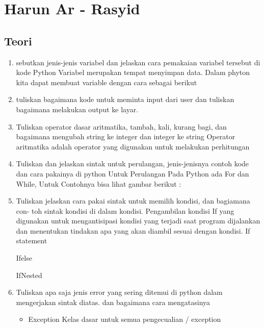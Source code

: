\section{Harun Ar - Rasyid}
\subsection{Teori}
\begin{enumerate}
    \item sebutkan jenis-jenis variabel dan jelaskan cara pemakaian variabel tersebut di
    kode Python
    Variabel merupakan tempat menyimpan data. Dalam phyton kita dapat membuat variable dengan cara sebagai berikut
    

    \item tuliskan bagaimana kode untuk meminta input dari user dan tuliskan bagaimana
    melakukan output ke layar.
    

    \item Tuliskan operator dasar aritmatika, tambah, kali, kurang bagi, dan bagaimana
    mengubah string ke integer dan integer ke string
    Operator  aritmatika adalah operator yang digunakan untuk melakukan perhitungan
    

    \item Tuliskan dan jelaskan sintak untuk perulangan, jenis-jenisnya contoh kode dan
    cara pakainya di python
    Untuk Perulangan Pada Python ada For dan While, Untuk Contohnya bisa lihat gambar berikut :
    

    \item Tuliskan jelaskan cara pakai sintak untuk memilih kondisi, dan bagiamana con-
    toh sintak kondisi di dalam kondisi.
    Pengambilan kondisi If yang digunakan untuk mengantisipasi kondisi yang terjadi saat program dijalankan dan menentukan tindakan apa yang akan diambil sesuai dengan kondisi.
    If statement
    
    
    Ifelse
    
    
    IfNested
    

    \item Tuliskan apa saja jenis error yang sering ditemui di python dalam mengerjakan
    sintak diatas. dan bagaimana cara mengatasinya
    \begin{itemize}
        \item Exception
        Kelas dasar untuk semua pengecualian / exception


\end{itemize}
\end{enumerate}
